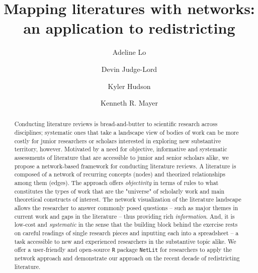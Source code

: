 \documentclass{cup-pan}
\title{Mapping literatures with networks: an application to redistricting}
\author[1]{Adeline Lo}
\author[2]{Devin Judge-Lord}
\author[1]{Kyler Hudson}
\author[1]{Kenneth R. Mayer}
\affil[1]{Department of Political Science, University of Wisconsin-Madison, 1050 Bascom Mall, Madison, WI 53706. Email: \url{aylo@wisc.edu}}
\affil[2]{Department of Government, Harvard University, 1737 Cambridge St, Cambridge, MA 02138.}
\begin{document}
\maketitle

\begin{abstract}
Conducting literature reviews is bread-and-butter to scientific research across disciplines; systematic ones that take a landscape view of bodies of work can be more costly for junior researchers or scholars interested in exploring new substantive territory, however. Motivated by a need for objective, informative and systematic assessments of literature that are accessible to junior and senior scholars alike, we propose a network-based framework for conducting literature reviews. A literature is composed of a network of recurring concepts (nodes) and theorized relationships among them (edges). The approach offers \textit{objectivity} in terms of rules to what constitutes the types of work that are the "universe" of scholarly work and main theoretical constructs of interest. 
The network visualization of the literature landscape allows the researcher to answer commonly posed questions -- such as major themes in current work and gaps in the literature -- thus providing rich \textit{information}. And, it is low-cost and \textit{systematic} in the sense that the building block behind the exercise rests on careful readings of single research pieces and inputting each into a spreadsheet -- a task accessible to new and experienced researchers in the substantive topic alike. We offer a user-friendly and open-source \texttt{R} package \texttt{NetLit} for researchers to apply the network approach and demonstrate our approach on the recent decade of redistricting literature.

\end{abstract}

\end{document}
